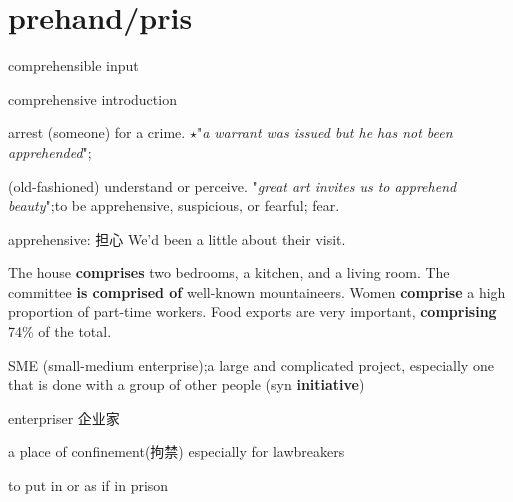 \chapter{prehand/pris}

\begin{vocabulary}
    comprehensible input
\end{vocabulary}

\begin{vocabulary}[comprehensive]
    comprehensive introduction
\end{vocabulary}

\begin{vocabulary}arrest (someone) for a crime.
    $\star$"\textit{a warrant was issued but he has not been apprehended}";
    
    (old-fashioned) understand or perceive.
    "\textit{great art invites us to apprehend beauty}";to be apprehensive, suspicious, or fearful; fear.

    apprehensive: 担心 We’d been a little  about their visit.
\end{vocabulary}

\begin{vocabulary}[surprise]
\end{vocabulary}

\begin{vocabulary}[comprise]
    The house \textbf{comprises} two bedrooms, a kitchen, and a living room. The committee \textbf{is comprised of} well-known mountaineers. Women \textbf{comprise} a high proportion of part-time workers. Food exports are very important, \textbf{comprising} 74\% of the total.
\end{vocabulary}

\begin{vocabulary}
    SME (small-medium enterprise);a large and complicated project, especially one that is done with a group of other people (syn \textbf{initiative})

    enterpriser 企业家
\end{vocabulary}

\begin{vocabulary}[prison]
    a place of confinement(拘禁) especially for lawbreakers
\end{vocabulary}

\begin{vocabulary}[imprison]
    to put in or as if in prison
\end{vocabulary}
